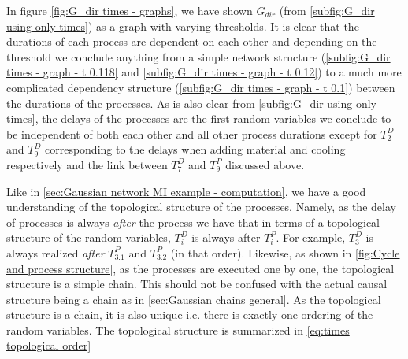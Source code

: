 \documentclass[../Thesis.tex]{subfiles}
\begin{document}
In figure \autoref{fig:G_dir times - graphs}, we have shown $G_{dir}$ (from \autoref{subfig:G_dir using only times}) as a graph with varying thresholds. It is clear that the durations of each process are dependent on each other and depending on the threshold we conclude anything from a simple network structure (\autoref{subfig:G_dir times - graph - t 0.118} and \autoref{subfig:G_dir times - graph - t 0.12}) to a much more complicated dependency structure (\autoref{subfig:G_dir times - graph - t 0.1}) between the durations of the processes. As is also clear from \autoref{subfig:G_dir using only times}, the delays of the processes are the first random variables we conclude to be independent of both each other and all other process durations except for $T^D_2$ and $T^D_9$ corresponding to the delays when adding material and cooling respectively and the link between $T^D_7$ and $T^P_9$ discussed above.


Like in \autoref{sec:Gaussian network MI example - computation}, we have a good understanding of the topological structure of the processes. Namely, as the delay of processes is always \textit{after} the process we have that in terms of a topological structure of the random variables, $T^D_i$ is always after $T^P_i$. For example, $T^D_3$ is always realized \textit{after} $T^P_{3.1}$ and $T^P_{3.2}$ (in that order). Likewise, as shown in \autoref{fig:Cycle and process structure}, as the processes are executed one by one, the topological structure is a simple chain. This should not be confused with the actual causal structure being a chain as in \autoref{sec:Gaussian chains general}. As the topological structure is a chain, it is also unique i.e. there is exactly one ordering of the random variables. The topological structure is summarized in \autoref{eq:times topological order}
\end{document}

